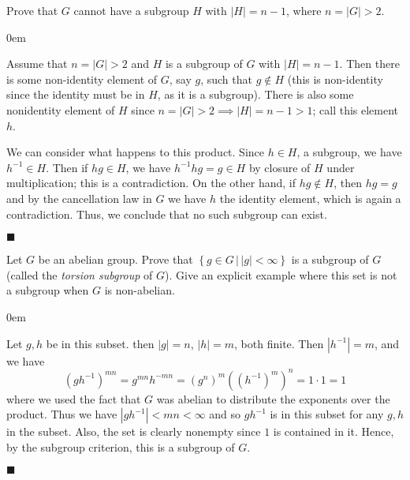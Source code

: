 \documentclass[12pt]{article}
\renewcommand{\qed}{\hfill$\blacksquare$}
\renewenvironment{proof}{\begin{addmargin}[1em]{0em}\begin{newproof}}{\end{newproof}\end{addmargin}\qed}
\newenvironment{problem}[2][Exercise]{\begin{trivlist}
\item[\hskip \labelsep {\bfseries #1}\hskip \labelsep {\bfseries #2.}]}{\end{trivlist}}
\begin{document}
\begin{problem}{2.1.5}
Prove that $G$ cannot have a subgroup $H$ with $\left|H\right|=n-1$, where $n=\left|G\right|>2$.
\end{problem}
\begin{proof}
Assume that $n=\left|G\right| >2$ and $H$ is a subgroup of $G$ with $\left|H\right| = n-1$. Then there is some non-identity element of $G$, say $g$, such that $g\notin H$ (this is non-identity since the identity must be in $H$, as it is a subgroup). There is also some nonidentity element of $H$ since $n=\left|G\right|>2 \implies \left| H\right|=n-1 > 1$; call this element $h$. 

We can consider what happens to this product. Since $h \in H$, a subgroup, we have $h^{-1} \in H$. Then if $hg \in H$, we have $h^{-1} h g = g \in H$ by closure of $H$ under multiplication; this is a contradiction. On the other hand, if $hg \notin H$, then $hg=g$ and by the cancellation law in $G$ we have $h$ the identity element, which is again a contradiction. Thus, we conclude that no such subgroup can exist.
\end{proof}


\begin{problem}{2.1.6}
Let $G$ be an abelian group. Prove that $\left\{ g\in G \, | \, \left|g\right|<\infty \right\}$ is a subgroup of $G$ (called the \textit{torsion subgroup} of $G$). Give an explicit example where this set is not a subgroup when $G$ is non-abelian.
\end{problem}
\begin{proof}
Let $g,h$ be in this subset. then $\left|g\right|=n$, $\left|h\right|=m$, both finite. Then $\left|h^{-1}\right|=m$, and we have
$$ \left(gh^{-1}\right)^{mn} = g^{mn} h^{-mn} = \left(g^n\right)^m \left(\left(h^{-1}\right)^m\right)^n = 1\cdot 1 = 1 $$ where we used the fact that $G$ was abelian to distribute the exponents over the product. Thus we have $\left|gh^{-1}\right| < mn <\infty $ and so $gh^{-1}$ is in this subset for any $g,h $ in the subset. Also, the set is clearly nonempty since $1$ is contained in it. Hence, by the subgroup criterion, this is a subgroup of $G$.
\end{proof}
\end{document}
